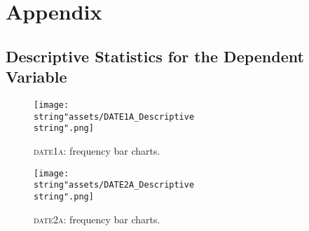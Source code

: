 
\lhead[\leftmark]{\leftmark}

\rhead[\leftmark]{}

\lfoot{}

\rfoot{}

\cfoot[\thepage]{\thepage}

\chapter{Appendix}

\section{Descriptive Statistics for the Dependent Variable}

\begin{figure}[h]
\begin{centering}
\texttt{[image: \\string"assets/DATE1A\_Descriptive\\string".png]}
\par\end{centering}
\begin{centering}
\caption{\textsc{date1a}: frequency bar charts.\label{fig:date1a:-frequency-bar}}
\par\end{centering}
\end{figure}

\begin{figure}[H]
\begin{centering}
\texttt{[image: \\string"assets/DATE2A\_Descriptive\\string".png]}
\par\end{centering}
\begin{centering}
\caption{\textsc{date2a}: frequency bar charts.\label{fig:date2a:-frequency-bar}}
\par\end{centering}
\end{figure}
\vfill{}

